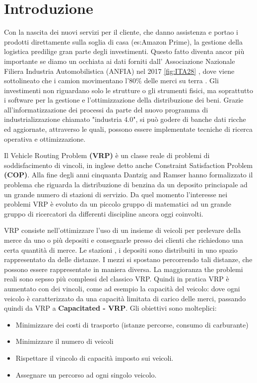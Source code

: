 \documentclass[]{article}
\begin{document}
\section{Introduzione}
Con la nascita dei nuovi servizi per il cliente, che danno assistenza e portao i prodotti direttamente sulla soglia di casa (es:Amazon Prime), la gestione della logistica predilige gran parte degli investimenti.
Questo fatto diventa ancor più importante se diamo un occhiata ai dati forniti dall' Associazione Nazionale Filiera Industria Automobilistica (ANFIA) nel 2017 \ref{fig:ITA28} , dove viene sottolineato che i camion movimentano l'80$\%$ delle merci su terra \cite{ANFIA2017}. 
Gli investimenti non riguardano solo le strutture o gli strumenti fisici, ma soprattutto i software per la gestione e l'ottimizzazione  della distribuzione dei beni.
Grazie all'informatizzazione dei processi da parte del nuovo programma di industrializzazione chiamato "industria 4.0", si può godere di banche dati ricche ed aggiornate, attraverso le quali, possono essere implementate tecniche di ricerca operativa e ottimizzazione.

Il Vehicle Routing Problem \textbf{(VRP)}  è un classe reale di problemi di soddisfacimento di vincoli, in inglese detto anche Constraint Satisfaction Problem \textbf{(COP)}.
Alla fine degli anni cinquanta Dantzig and Ramser hanno formalizzato il problema \cite{dispatching} che riguarda la distribuzione di benzina da un deposito princiapale ad un grande numero di stazioni di servizio.
Da quel momento l'interesse nei problemi VRP è evoluto da un piccolo gruppo di matematici ad un grande gruppo di ricercatori da differenti discipline ancora oggi coinvolti.


VRP consiste nell'ottimizzare l'uso di un insieme di veicoli per prelevare della merce da uno o più depositi e consegnarle presso dei clienti che richiedono una certa quantità di merce.
Le stazioni , i depositi sono distribuiti in uno spazio rappresentato da delle distanze. I mezzi si spostano percorrendo tali distanze, che possono essere rappresentate in maniera diversa.
La maggioranza the problemi reali sono sepsso più complessi del classico VRP. Quindi in pratica VRP è aumentato con dei vincoli, come ad esempio la capacità del veicolo: dove ogni veicolo è caratterizzato da una capacità limitata di carico delle merci, passando quindi da VRP a \textbf{Capacitated - VRP}.
Gli obiettivi sono molteplici:
\begin{itemize}
	\item Minimizzare dei costi di trasporto (istanze percorse, consumo di carburante)
	\item Minimizzare il numero di veicoli
	\item Rispettare il vincolo di capacità imposto  sui veicoli.
	\item Assegnare un percorso ad ogni singolo veicolo.
\end{itemize}
\end{document}
